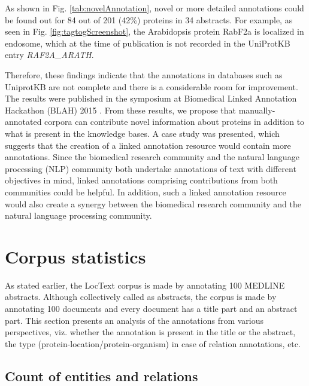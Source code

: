 
As shown in Fig. \ref{tab:novelAnnotation}, novel or more detailed annotations could be found out for 84 out of 201 (42\%) proteins in 34 abstracts. For example, as seen in Fig. \ref{fig:tagtogScreenshot}, the Arabidopsis protein RabF2a is localized in endosome, which at the time of publication is not recorded in the UniProtKB entry \emph{RAF2A\_ARATH}.

Therefore, these findings indicate that the annotations in databases such as UniprotKB are not complete and there is a considerable room for improvement. The results \cite{goldberg2015linked} were published in the symposium at Biomedical Linked Annotation Hackathon (BLAH) 2015 \cite{blah}. From these results, we propose that manually-annotated corpora can contribute novel information about proteins in addition to what is present in the knowledge bases. A case study was presented, which suggests that the creation of a linked annotation resource would contain more annotations. Since the biomedical research community and the natural language processing (NLP) community both undertake annotations of text with different objectives in mind, linked annotations comprising contributions from both communities could be helpful. In addition, such a linked annotation resource would also create a synergy between the biomedical research community and the natural language processing community.


\section{Corpus statistics}\label{sec:corpusStats}


As stated earlier, the LocText corpus is made by annotating 100 MEDLINE abstracts. Although collectively called as abstracts, the corpus is made by annotating 100 documents and every document has a title part and an abstract part. This section presents an analysis of the annotations from various perspectives, viz. whether the annotation is present in the title or the abstract, the type (protein-location/protein-organism) in case of relation annotations, etc.

\subsection*{Count of entities and relations}

